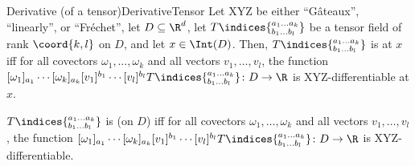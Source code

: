 \begin{mdf}{Derivative (of a tensor)}{DerivativeTensor}
Let XYZ be either ``Gâteaux'', ``linearly'', or ``Fréchet'', let $D\subseteq \R^d$, let $T\indices{^{a_1\dots a_k}_{b_1\dots b_l}}$ be a tensor field of rank $\coord{k,l}$ on $D$, and let $x\in \Int (D)$.  Then, $T\indices{^{a_1\ldots a_k}_{b_1\ldots b_l}}$ is  at $x$ iff for all covectors $\omega _1,\ldots ,\omega _k$ and all vectors $v_1,\ldots ,v_l$, the function $[\omega _1]_{a_1}\cdots [\omega _k]_{a_k}[v_1]^{b_1}\cdots [v_l]^{b_l}T\indices{^{a_1\dots a_k}_{b_1\dots b_l}}\colon D\rightarrow \R$ is XYZ-differentiable at $x$.

$T\indices{^{a_1\dots a_k}_{b_1\dots b_l}}$ is  (on $D$) iff for all covectors $\omega _1,\ldots ,\omega _k$ and all vectors $v_1,\ldots ,v_l$, the function $[\omega _1]_{a_1}\cdots [\omega _k]_{a_k}[v_1]^{b_1}\cdots [v_l]^{b_l}T\indices{^{a_1\dots a_k}_{b_1\dots b_l}}\colon D\rightarrow \R$ is XYZ-differentiable.
	

\end{mdf}
